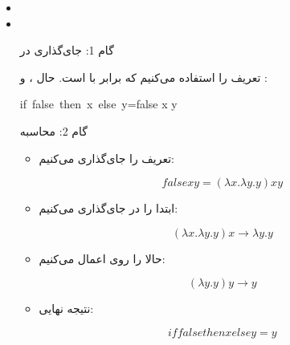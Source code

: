 \documentclass[11pt, a4paper, oneside]{article}
\begin{document}
\begin{itemize}
\begin{itemize}
				\item {}
				
				\item {}
				
			\end{itemize}
			
			\begin{itemize}
				
				\item[گام 1:] جای‌گذاری در 
					
					تعریف  را استفاده می‌کنیم که برابر با  است. حال ،  و :
					
					if false then x else y=false x y

				\item[گام 2:] محاسبه 
				
				\begin{itemize}
					
					\item تعریف  را جای‌گذاری می‌کنیم:
					
					\[
					false x y=(\lambda x.\lambda y.y)xy
					\]
					
					\item ابتدا  را در  جای‌گذاری می‌کنیم:
					
					\[
					(\lambda x.\lambda y.y)x \rightarrow \lambda y.y
					\]
					
					\item حالا  را روی  اعمال می‌کنیم:
					
					\[
					(\lambda y.y)y \rightarrow y
					\]
					
					\item نتیجه نهایی:
					
					\[
					if false then x else y=y
					\]
					
					
				\end{itemize}
				
			\end{itemize}
				
		\end{itemize}
		
\end{document}
